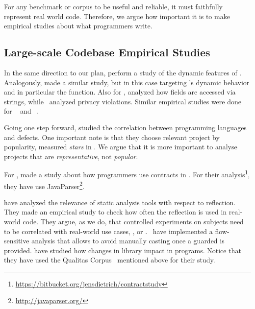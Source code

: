For any benchmark or corpus to be useful and reliable, it must faithfully represent real world code.
Therefore, we argue how important it is to make empirical studies about what programmers write.

\subsection{Large-scale Codebase Empirical Studies} \label{sec:rw:largescale}

In the same direction to our plan, \cite{callau_how_2013} perform a study of the dynamic features of \smalltalk{}. 
Analogously, \cite{richards_analysis_2010,richards_eval_2011} made a similar study, but in this case targeting \javascript{}'s dynamic behavior and in particular the  function. 
Also for \javascript{}, \cite{madsen_string_2014} analyzed how fields are accessed via strings, while~\cite{jang_empirical_2010} analyzed privacy violations. 
Similar empirical studies were done for \php{}~\cite{hills_empirical_2013,dahse_experience_2015,doyle_empirical_2011} and \swift{}~\cite{reboucas_empirical_2016}.  

Going one step forward, \cite{ray_large-scale_2017} studied the correlation between programming languages and defects. 
One important note is that they choose relevant project by popularity, measured \emph{stars} in \github{}. 
We argue that it is more important to analyse projects that are \emph{representative}, not \emph{popular}. 

For \java{}, \cite{dietrich_contracts_2017-1} made a study about how programmers use contracts in \mavencentral{}.
For their analysis\footnote{\url{https://bitbucket.org/jensdietrich/contractstudy}}, they have use JavaParser\footnote{\url{http://javaparser.org/}}.

\cite{landman_challenges_2017} have analyzed the relevance of static analysis tools with respect to reflection. 
They made an empirical study to check how often the reflection \api{} is used in real-world code. 
They argue, as we do, that controlled experiments on subjects need to be correlated with real-world use cases, \eg{}, \github{} or \mavencentral{}. 
\cite{winther_guarded_2011} ~have implemented a flow-sensitive analysis that allows to avoid manually casting once a guarded  is provided. 
\cite{dietrich_broken_2014} have studied how changes in \api{} library impact in \java{} programs. 
Notice that they have used the Qualitas Corpus~\cite{tempero_qualitas_2010} mentioned above for their study. 

